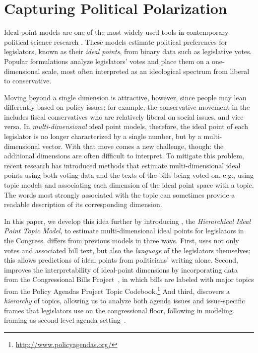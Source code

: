 
\section{Capturing Political Polarization}
\label{sec:c6_intro}


Ideal-point models are one of the most widely used tools in
contemporary political science research \cite{Poole:Book07:ideology}.
These models estimate political preferences for legislators, known as
their \emph{ideal points}, from binary data such as legislative votes.
Popular formulations analyze legislators' votes and place them on a
one-dimensional scale, most often interpreted as an ideological
spectrum from liberal to conservative.

Moving beyond a single dimension is attractive, however, since people
may lean differently based on policy issues; for example, the
conservative movement in the \us{} includes fiscal conservatives
who are relatively liberal on social issues, and vice versa. In
\textit{multi-dimensional} ideal point models, therefore, the ideal
point of each legislator is no longer characterized by a single
number, but by a multi-dimensional
vector. With that move comes a new challenge, though: the additional
dimensions are often difficult to interpret. To mitigate this problem,
recent research has introduced methods that estimate multi-dimensional
ideal points using both voting data and the texts of the bills being
voted on, e.g., using topic models and associating each dimension of
the ideal point space with a topic. The words most strongly associated with the topic can sometimes
provide a readable description of its corresponding dimension.

In this paper, we develop this idea further by introducing \name{},
the \textit{Hierarchical Ideal Point Topic Model}, to estimate
multi-dimensional ideal points for legislators in the \us{}
Congress. \name{} differs from previous models in three ways. First,
\name{} uses not only votes and associated bill text, but also the
\emph{language} of the legislators themselves; this allows predictions
of ideal points from politicians' writing alone. Second, \name{}
improves the interpretability of ideal-point dimensions by
incorporating data from the Congressional Bills Project~\cite{CBP}, in
which bills are labeled with major topics from the Policy
Agendas Project Topic Codebook.\footnote{\url{http://www.policyagendas.org/}} And third,
\name{} discovers a \emph{hierarchy} of topics, allowing us to analyze
both agenda issues and issue-specific frames that legislators use on
the congressional floor, following  in modeling
framing as second-level agenda setting~\cite{McCombs:JS05}.


